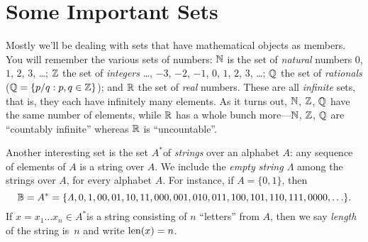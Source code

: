 \documentclass[open-logic-section]{subfiles}
\begin{document}
\section{Some Important Sets}

\begin{ex}
Mostly we'll be dealing with sets that have mathematical objects as
members. You will remember the various sets of numbers: $\mathbb{N}$
is the set of \emph{natural} numbers $0$, $1$, $2$, $3$, \dots{};
$\mathbb{Z}$ the set of \emph{integers} \ldots{}, $-3$, $-2$,
$-1$, $0$, $1$, $2$, $3$, \ldots{}; $\mathbb{Q}$ the set of
\emph{rationals} ($\mathbb{Q} = \{ p/q : p,q\in \mathbb{Z} \}$); and
$\mathbb{R}$ the set of \emph{real} numbers. These are all \emph{infinite}
sets, that is, they each have infinitely many elements. As it turns
out, $\mathbb{N}$, $\mathbb{Z}$, $\mathbb{Q}$ have the same number
of elements, while $\mathbb{R}$ has a whole bunch more---$\mathbb{N}$,
$\mathbb{Z}$, $\mathbb{Q}$ are ``countably infinite'' whereas
$\mathbb{R}$ is ``uncountable''.
\end{ex}

\begin{ex}[Strings]
Another interesting set is the set $A^{*}$of
\emph{strings} over an alphabet $A$: any sequence of elements of
$A$ is a string over $A$. We include the \emph{empty string $\Lambda$}
among the strings over $A$, for every alphabet $A$. For instance,
if $A=\{0,1\}$, then 
\[
\mathbb{B} = A^{*}
=\{\Lambda,0,1,00,01,10,11,000,001,010,011,100,101,110,111,0000,\ldots\}.
\]
 If $x=x_{1}\ldots x_{n}\in A^{*}$is a string consisting of $n$
``letters'' from $A$, then we say \emph{length} of the string is~$n$
and write $\mathrm{len}(x)=n$.
\end{ex}
\end{document}
